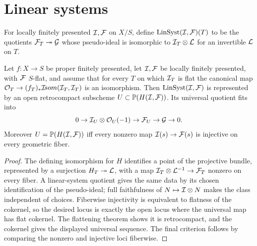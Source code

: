 \section{Linear systems}

\begin{definition}
\label{akcp-4-1-linear-system}
For locally finitely presented $\mathcal I,\mathcal F$ on $X/S$, define
$\operatorname{LinSyst}(\mathcal I,\mathcal F)(T)$ to be the quotients $\mathcal F_T\twoheadrightarrow\mathcal G$
whose pseudo-ideal is isomorphic to $\mathcal I_T\otimes\mathcal L$ for an invertible
$\mathcal L$ on $T$.
\end{definition}

\begin{theorem}
\label{akcp-4-2-linear-representability}
Let $f:X\to S$ be proper finitely presented, let $\mathcal I,\mathcal F$ be locally finitely
presented, with $\mathcal F$ $S$-flat, and assume that for every $T$ on which $\mathcal I_T$
is flat the canonical map
$\mathcal O_T\to(f_T)_*\mathcal I\!som(\mathcal I_T,\mathcal I_T)$ is an isomorphism.  Then
$\operatorname{LinSyst}(\mathcal I,\mathcal F)$ is represented by an open retrocompact subscheme
$U\subset\mathbb P(H(\mathcal I,\mathcal F))$.  Its universal quotient fits into
\[
0\to\mathcal I_U\otimes\mathcal O_U(-1)\to\mathcal F_U\to\mathcal G\to0.
\]
Moreover $U=\mathbb P(H(\mathcal I,\mathcal F))$ iff every nonzero map
$\mathcal I(s)\to\mathcal F(s)$ is injective on every geometric fiber.
\end{theorem}
\begin{proof}
The defining isomorphism for $H$ identifies a point of the projective bundle,
represented by a surjection $H_T\twoheadrightarrow\mathcal L$, with a map
$\mathcal I_T\otimes\mathcal L^{-1}\to\mathcal F_T$ nonzero on every fiber.  A linear-system
quotient gives the same data by its chosen identification of the pseudo-ideal;
full faithfulness of $N\mapsto\mathcal I\otimes N$ makes the class independent of
choices.  Fiberwise injectivity is equivalent to flatness of the cokernel, so
the desired locus is exactly the open locus where the universal map has flat
cokernel.  The flattening theorem shows it is retrocompact, and the cokernel
gives the displayed universal sequence.  The final criterion follows by
comparing the nonzero and injective loci fiberwise.
\end{proof}


